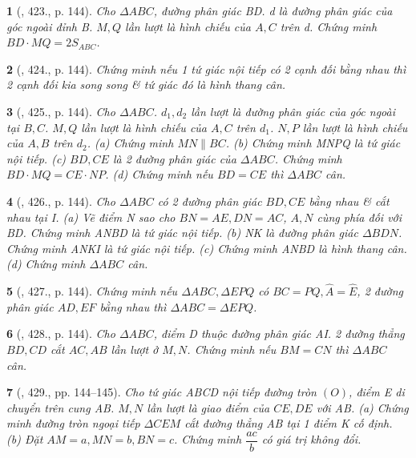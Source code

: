 \documentclass{article}
\newtheorem{baitoan}{}
\begin{document}
\begin{baitoan}[\cite{Binh_Toan_9_tap_2}, 423., p. 144]
	Cho $\Delta ABC$, đường phân giác BD. d là đường phân giác của góc ngoài đỉnh B. $M,Q$ lần lượt là hình chiếu của $A,C$ trên d. Chứng minh $BD\cdot MQ = 2S_{ABC}$.
\end{baitoan}

\begin{baitoan}[\cite{Binh_Toan_9_tap_2}, 424., p. 144]
	Chứng minh nếu 1 tứ giác nội tiếp có 2 cạnh đối bằng nhau thì 2 cạnh đối kia song song \& tứ giác đó là hình thang cân.
\end{baitoan}

\begin{baitoan}[\cite{Binh_Toan_9_tap_2}, 425., p. 144]
	Cho $\Delta ABC$. $d_1,d_2$ lần lượt là đường phân giác của góc ngoài tại $B,C$. $M,Q$ lần lượt là hình chiếu của $A,C$ trên $d_1$. $N,P$ lần lượt là hình chiếu của $A,B$ trên $d_2$. (a) Chứng minh $MN\parallel BC$. (b) Chứng minh MNPQ là tứ giác nội tiếp. (c) $BD,CE$ là 2 đường phân giác của $\Delta ABC$. Chứng minh $BD\cdot MQ = CE\cdot NP$. (d) Chứng minh nếu $BD = CE$ thì $\Delta ABC$ cân.
\end{baitoan}

\begin{baitoan}[\cite{Binh_Toan_9_tap_2}, 426., p. 144]
	Cho $\Delta ABC$ có 2 đường phân giác $BD,CE$ bằng nhau \& cắt nhau tại I. (a) Vẽ điểm N sao cho $BN = AE,DN = AC$, $A,N$ cùng phía đối với BD. Chứng minh ANBD là tứ giác nội tiếp. (b) NK là đường phân giác $\Delta BDN$. Chứng minh ANKI là tứ giác nội tiếp. (c) Chứng minh ANBD là hình thang cân. (d) Chứng minh $\Delta ABC$ cân.
\end{baitoan}

\begin{baitoan}[\cite{Binh_Toan_9_tap_2}, 427., p. 144]
	Chứng minh nếu $\Delta ABC,\Delta EPQ$ có $BC = PQ,\widehat{A} = \widehat{E}$, 2 đường phân giác $AD,EF$ bằng nhau thì $\Delta ABC = \Delta EPQ$.
\end{baitoan}

\begin{baitoan}[\cite{Binh_Toan_9_tap_2}, 428., p. 144]
	Cho $\Delta ABC$, điểm D thuộc đường phân giác AI. 2 đường thẳng $BD,CD$ cắt $AC,AB$ lần lượt ở $M,N$. Chứng minh nếu $BM = CN$ thì $\Delta ABC$ cân.
\end{baitoan}

\begin{baitoan}[\cite{Binh_Toan_9_tap_2}, 429., pp. 144--145]
	Cho tứ giác ABCD nội tiếp đường tròn $(O)$, điểm E di chuyển trên cung AB. $M,N$ lần lượt là giao điểm của $CE,DE$ với AB. (a) Chứng minh đường tròn ngoại tiếp $\Delta CEM$ cắt đường thẳng AB tại 1 điểm K cố định. (b) Đặt $AM = a,MN = b,BN = c$. Chứng minh $\dfrac{ac}{b}$ có giá trị không đổi.
\end{baitoan}
\end{document}
